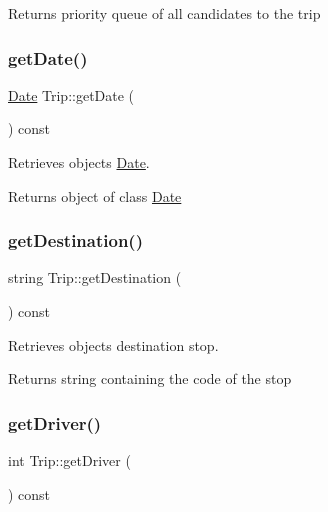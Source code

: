 \begin{DoxyReturn}{Returns}
priority queue of all candidates to the trip 
\end{DoxyReturn}
\mbox{\label{group___trip_ga322346fb52d53fb0a94819059916d0fe}} 
\subsubsection{\texorpdfstring{get\+Date()}{getDate()}}
{\footnotesize\ttfamily \hyperlink{class_date}{Date} Trip\+::get\+Date (\begin{DoxyParamCaption}{ }\end{DoxyParamCaption}) const}



Retrieves object\textquotesingle{}s \hyperlink{class_date}{Date}. 

\begin{DoxyReturn}{Returns}
object of class \hyperlink{class_date}{Date} 
\end{DoxyReturn}
\mbox{\label{group___trip_ga576ad0d4c7a723aa4b2d12ebdd4eec99}} 
\subsubsection{\texorpdfstring{get\+Destination()}{getDestination()}}
{\footnotesize\ttfamily string Trip\+::get\+Destination (\begin{DoxyParamCaption}{ }\end{DoxyParamCaption}) const}



Retrieves object\textquotesingle{}s destination stop. 

\begin{DoxyReturn}{Returns}
string containing the code of the stop 
\end{DoxyReturn}
\mbox{\label{group___trip_gabc996cddbc65b41987dd8d4d9776c729}} 
\subsubsection{\texorpdfstring{get\+Driver()}{getDriver()}}
{\footnotesize\ttfamily int Trip\+::get\+Driver (\begin{DoxyParamCaption}{ }\end{DoxyParamCaption}) const}



